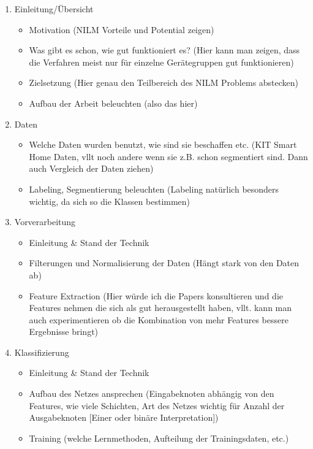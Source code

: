 \documentclass[10pt, a4paper]{report}
\begin{document}
\begin{enumerate}
	\item Einleitung/Übersicht
	\begin{itemize}
		\item Motivation (NILM Vorteile und Potential zeigen)
		\item Was gibt es schon, wie gut funktioniert es? (Hier kann man zeigen, dass die Verfahren meist nur für einzelne Gerätegruppen gut funktionieren)
		\item Zielsetzung (Hier genau den Teilbereich des NILM Problems abstecken)
		\item Aufbau der Arbeit beleuchten (also das hier)
	\end{itemize}
	
	\item Daten
	\begin{itemize}
		\item Welche Daten wurden benutzt, wie sind sie beschaffen etc. (KIT Smart Home Daten, vllt noch andere wenn sie z.B. schon segmentiert sind. Dann auch Vergleich der Daten ziehen)
		\item Labeling, Segmentierung beleuchten (Labeling natürlich besonders wichtig, da sich so die Klassen bestimmen)
	\end{itemize}
	
	\item Vorverarbeitung
	\begin{itemize}
		\item Einleitung \& Stand der Technik
		\item Filterungen und Normalisierung der Daten (Hängt stark von den Daten ab)
		\item Feature Extraction (Hier würde ich die Papers konsultieren und die Features nehmen die sich als gut herausgestellt haben, vllt. kann man auch experimentieren ob die Kombination von mehr Features bessere Ergebnisse bringt) 
	\end{itemize}
	
	\item Klassifizierung
	\begin{itemize}
		\item Einleitung \& Stand der Technik
		\item Aufbau des Netzes ansprechen (Eingabeknoten abhängig von den Features, wie viele Schichten, Art des Netzes wichtig für Anzahl der Ausgabeknoten [Einer oder binäre Interpretation])
		\item Training (welche Lernmethoden, Aufteilung der Trainingsdaten, etc.)
	\end{itemize}
	

\end{enumerate}
\end{document}
